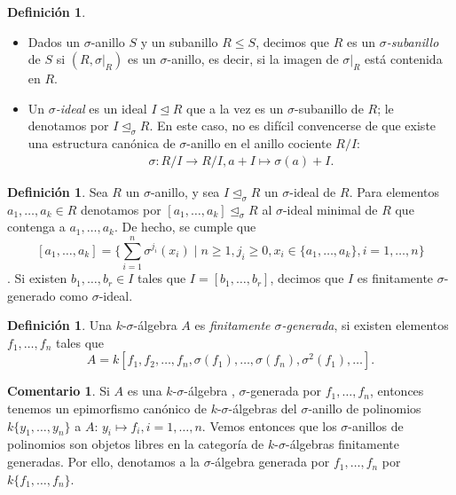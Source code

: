 \documentclass[letterpaper]{article}
\def\s{\sigma}
\def\si{\unlhd_{\sigma}}
\theoremstyle{definition}
\newtheorem{rem}[Satz]{Comentario}
\newtheorem{defn}[Satz]{Definici\'on}
\begin{document}
\begin{defn} $\phantom{}$
\begin{itemize}
\item Dados un $\sigma$-anillo $S$  y un subanillo $R \leq S$, decimos que $R$ es un $\sigma$\emph{-subanillo} de $S$ si $(R,\sigma|_{R})$ es un $\sigma$-anillo,
es decir, si la imagen de $\sigma|_{R}$ est\'a contenida en $R$.
\item Un $\sigma$\emph{-ideal} es un ideal $I \unlhd R$ que a la vez es un $\sigma$-subanillo de $R$; le denotamos por $I \si R$. En este caso, no es dif\'icil convencerse de que existe una estructura can\'onica de $\sigma$-anillo en el anillo cociente $R/I$:
\begin{align*} \sigma: R/I \rightarrow R/I, a + I \mapsto \sigma(a) + I. \end{align*}
\end{itemize}
\end{defn}

\begin{defn}
Sea $R$ un $\s$-anillo, y sea $I \si R$ un $\s$-ideal de $R$. Para elementos $a_1, \ldots, a_k \in R$ denotamos por $[a_1, \ldots, a_k] \si R$ al $\s$-ideal minimal de $R$ que contenga a $a_1,\ldots,a_k$. 
De hecho, se cumple que \[[a_1,\ldots,a_k] = \{ \sum_{i=1}^n \s^{j_i}(x_i) \mid n \geq 1, j_i \geq 0, x_i \in \{a_1,\ldots,a_k\}, i=1,\ldots,n \} \]. Si existen $b_1,\ldots,b_r \in I$ tales que $I = [b_1,\ldots,b_r]$,
 decimos que $I$ es finitamente $\s$-generado como $\s$-ideal.
\end{defn}

\begin{defn}
Una $k$-$\sigma$-\'algebra  $A$ es \emph{finitamente $\sigma$-generada}, si existen elementos $f_1, \ldots, f_n$ tales que $$A = k[f_1,f_2,\ldots,f_n,\sigma(f_1),\ldots,\sigma(f_n),\sigma^2(f_1),\ldots].$$
\end{defn}

\begin{rem}\label{epipoli}
Si $A$ es una $k$-$\sigma$-\'algebra , $\sigma$-generada por $f_1, \ldots, f_n$, entonces tenemos un epimorfismo can\'onico de $k$-$\sigma$-\'algebras del $\sigma$-anillo de polinomios $k\{y_1, \ldots, y_n \}$ a $A$: $y_i \mapsto f_i, i = 1, \ldots, n$. Vemos entonces que los $\sigma$-anillos de polinomios son objetos libres en la categor\'ia de $k$-$\sigma$-\'algebras finitamente generadas. Por ello, denotamos a la $\sigma$-\'algebra  generada por $f_1, \ldots, f_n$ por $k\{f_1, \ldots, f_n\}$.
\end{rem}
\end{document}
